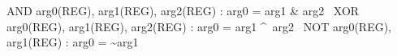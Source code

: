\documentclass{article}
\begin{document}
\begin{tcolorbox}
\ttfamily
AND arg0(REG), arg1(REG), arg2(REG) : arg0 = arg1 \& arg2 \
XOR arg0(REG), arg1(REG), arg2(REG) : arg0 = arg1 \textasciicircum\ arg2 \
NOT arg0(REG), arg1(REG) : arg0 = \textasciitilde arg1
\end{tcolorbox}
\end{document}
